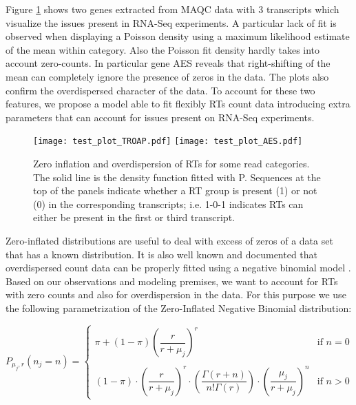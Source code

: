 \documentclass[11pt]{article}
\begin{document}
\noindent Figure \ref{example} shows two genes extracted from MAQC \cite{shi2006microarray} data with $3$ transcripts which visualize the issues present in RNA-Seq experiments. A particular lack of fit is observed when displaying a Poisson density using a maximum likelihood estimate of the mean within category. Also the Poisson fit density hardly takes into account zero-counts. In particular gene AES reveals that right-shifting of the mean can completely ignore the presence of zeros in the data. The plots also confirm the overdispersed character of the data. To account for these two features, we propose a model able to fit flexibly RTs count data introducing extra parameters that can account for issues present on RNA-Seq experiments.


\begin{figure}[H]
  \centering
    \texttt{[image: test\_plot\_TROAP.pdf]}  
    \texttt{[image: test\_plot\_AES.pdf]}
    
    
  \caption{Zero inflation and overdispersion of RTs for some read categories. The solid line is the density function fitted with P. Sequences at the top of the panels indicate whether a RT group is present (1) or not (0) in the corresponding transcripts; i.e. 1-0-1 indicates RTs can either be present in the first or third transcript.}
  \label{example}
\end{figure}

  
\noindent Zero-inflated distributions are useful to deal with excess of zeros of a data set that has a known distribution. It is also well known and documented that overdispersed count data can be properly fitted using a negative binomial model \cite{anders2010differential}. Based on our observations and modeling premises, we want to account for RTs with zero counts and also for overdispersion in the data. For this purpose we use the following parametrization of the Zero-Inflated Negative Binomial distribution:

  \[P_{\mu_j, r}(n_j=n)=
    \begin{cases}
      \pi+(1-\pi)\left(\dfrac{r}{r+\mu_j}\right)^r& \text{if } n=0\\
      &\\
      (1-\pi)\cdot\left(\dfrac{r}{r+\mu_j}\right)^r \cdot \left(\dfrac{\Gamma(r+n)}{n!\Gamma(r)}\right) \cdot \left(\dfrac{\mu_j}{r+\mu_j}\right)^n &  \text{if } n>0
    \end{cases}
  \]
\end{document}
